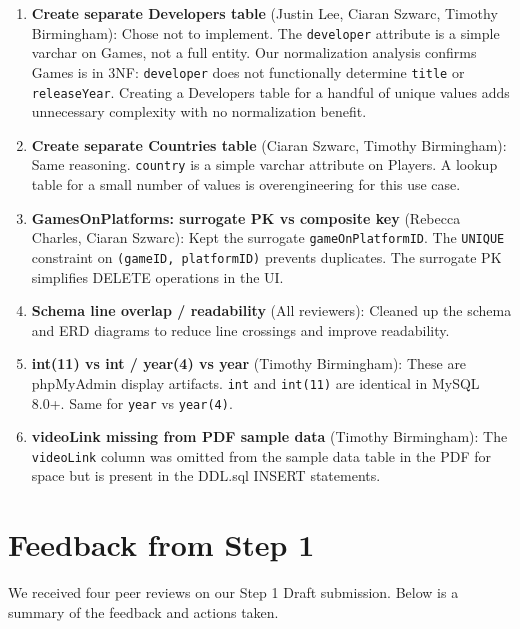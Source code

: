 \documentclass[11pt]{article}
\begin{document}
\begin{enumerate}[leftmargin=2em]
    \item \textbf{Create separate Developers table} (Justin Lee, Ciaran Szwarc, Timothy Birmingham): Chose not to implement. The \texttt{developer} attribute is a simple varchar on Games, not a full entity. Our normalization analysis confirms Games is in 3NF: \texttt{developer} does not functionally determine \texttt{title} or \texttt{releaseYear}. Creating a Developers table for a handful of unique values adds unnecessary complexity with no normalization benefit.

    \item \textbf{Create separate Countries table} (Ciaran Szwarc, Timothy Birmingham): Same reasoning. \texttt{country} is a simple varchar attribute on Players. A lookup table for a small number of values is overengineering for this use case.

    \item \textbf{GamesOnPlatforms: surrogate PK vs composite key} (Rebecca Charles, Ciaran Szwarc): Kept the surrogate \texttt{gameOnPlatformID}. The \texttt{UNIQUE} constraint on \texttt{(gameID, platformID)} prevents duplicates. The surrogate PK simplifies DELETE operations in the UI.

    \item \textbf{Schema line overlap / readability} (All reviewers): Cleaned up the schema and ERD diagrams to reduce line crossings and improve readability.

    \item \textbf{int(11) vs int / year(4) vs year} (Timothy Birmingham): These are phpMyAdmin display artifacts. \texttt{int} and \texttt{int(11)} are identical in MySQL 8.0+. Same for \texttt{year} vs \texttt{year(4)}.

    \item \textbf{videoLink missing from PDF sample data} (Timothy Birmingham): The \texttt{videoLink} column was omitted from the sample data table in the PDF for space but is present in the DDL.sql INSERT statements.
\end{enumerate}

\hrulefill

\section*{Feedback from Step 1}

We received four peer reviews on our Step 1 Draft submission. Below is a summary of the feedback and actions taken.
\end{document}
